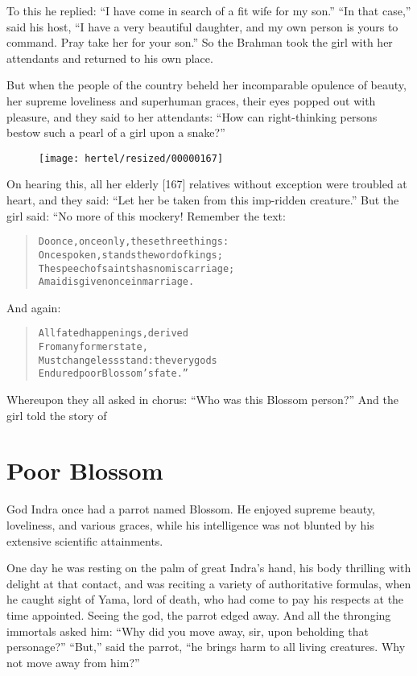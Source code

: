 \documentclass[article, twoside, 10pt]{memoir}
\renewenvironment{verbatim}{%
\begin{quote}%
\vskip -10pt%
\begin{alltt}\normalfont\small}{\end{alltt}%
\end{quote}%
\vskip -10pt
} %
\begin{document}
To this he replied:
``I have come in search of a fit wife for my son.''
``In that case,'' said his host,
``I have a very beautiful daughter, and my own person is yours to command. Pray take her for your son.''
So the Brahman took the girl with her attendants and returned to
his own place.

But when the people of the country beheld her incomparable opulence
of beauty, her supreme loveliness and superhuman graces, their eyes
popped out with pleasure, and they said to her attendants:
``How can right-thinking persons bestow such a pearl of a girl upon a snake?''
\begin{figure}[p]\texttt{[image: hertel/resized/00000167]}\end{figure}On hearing this, all her elderly [167] relatives without exception
were troubled at heart, and they said:
``Let her be taken from this imp-ridden creature.'' But the girl
said: “No more of this mockery! Remember the text:

\begin{verbatim}
Do once, once only, these three things:
Once spoken, stands the word of kings;
The speech of saints has no miscarriage;
A maid is given once in marriage.
\end{verbatim}
And again:

\begin{verbatim}
All fated happenings, derived
    From any former state,
Must changeless stand: the very gods
    Endured poor Blossom's fate.”
\end{verbatim}
Whereupon they all asked in chorus:
``Who was this Blossom person?'' And the girl told the story of

\chapter{Poor Blossom}

God Indra once had a parrot named Blossom. He enjoyed supreme
beauty, loveliness, and various graces, while his intelligence was
not blunted by his extensive scientific attainments.

One day he was resting on the palm of great Indra's hand, his body
thrilling with delight at that contact, and was reciting a variety
of authoritative formulas, when he caught sight of Yama, lord of
death, who had come to pay his respects at the time appointed.
Seeing the god, the parrot edged away. And all the thronging
immortals asked him:
``Why did you move away, sir, upon beholding that personage?''
``But,'' said the parrot,
``he brings harm to all living creatures. Why not move away from him?''
\end{document}
